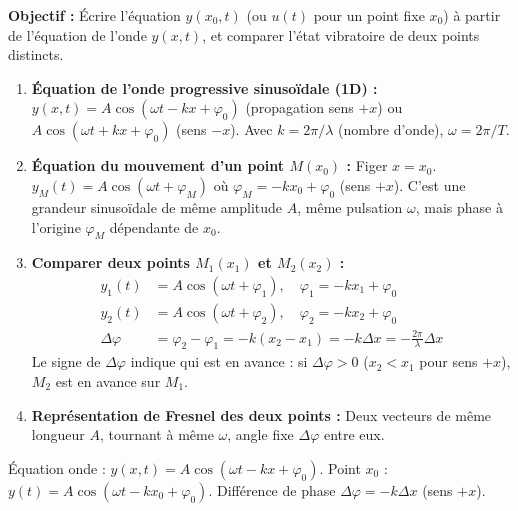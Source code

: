 \documentclass[11pt]{article}
\begin{document}
\begin{methode}
\textbf{Objectif :} Écrire l'équation $y(x_0, t)$ (ou $u(t)$ pour un point fixe $x_0$) à partir de l'équation de l'onde $y(x,t)$, et comparer l'état vibratoire de deux points distincts.
\begin{enumerate}
    \item \textbf{Équation de l'onde progressive sinusoïdale (1D) :}
    $y(x,t) = A \cos(\omega t - k x + \varphi_0)$ (propagation sens $+x$) ou $A \cos(\omega t + k x + \varphi_0)$ (sens $-x$).
    Avec $k = 2\pi/\lambda$ (nombre d'onde), $\omega = 2\pi/T$.
    \item \textbf{Équation du mouvement d'un point $M(x_0)$ :} Figer $x = x_0$.
    $y_{M}(t) = A \cos(\omega t + \varphi_{M})$ où $\varphi_{M} = -k x_0 + \varphi_0$ (sens $+x$).
    C'est une grandeur sinusoïdale de même amplitude $A$, même pulsation $\omega$, mais phase à l'origine $\varphi_{M}$ dépendante de $x_0$.
    \item \textbf{Comparer deux points $M_1(x_1)$ et $M_2(x_2)$ :}
    \begin{align*}
        y_1(t) &= A \cos(\omega t + \varphi_1), \quad \varphi_1 = -k x_1 + \varphi_0 \\
        y_2(t) &= A \cos(\omega t + \varphi_2), \quad \varphi_2 = -k x_2 + \varphi_0 \\
        \Delta \varphi &= \varphi_2 - \varphi_1 = -k(x_2 - x_1) = -k \Delta x = -\frac{2\pi}{\lambda}\Delta x
    \end{align*}
    Le signe de $\Delta \varphi$ indique qui est en avance : si $\Delta \varphi > 0$ ($x_2 < x_1$ pour sens $+x$), $M_2$ est en avance sur $M_1$.
    \item \textbf{Représentation de Fresnel des deux points :} Deux vecteurs de même longueur $A$, tournant à même $\omega$, angle fixe $\Delta \varphi$ entre eux.
\end{enumerate}
\begin{aretenir}Équation onde : $y(x,t)=A\cos(\omega t - kx + \varphi_0)$. Point $x_0$ : $y(t)=A\cos(\omega t - kx_0 + \varphi_0)$. Différence de phase $\Delta\varphi = -k\Delta x$ (sens $+x$).\end{aretenir}
\end{methode}
\end{document}

